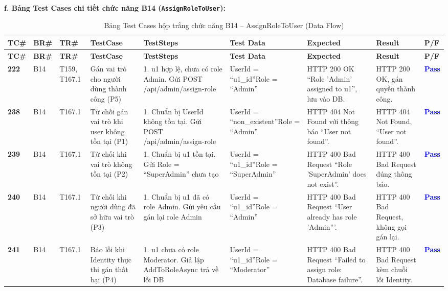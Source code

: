 \documentclass[11pt,a4paper]{article}
\begin{document}
\noindent\textbf{f. Bảng Test Cases chi tiết chức năng B14 (\texttt{AssignRoleToUser}):}
\begingroup
\scriptsize
\setlength{\tabcolsep}{3pt}
\begin{longtable}{|C{0.8cm}|C{0.75cm}|C{0.95cm}|L{2.0cm}|L{3.0cm}|L{2.25cm}|L{2.6cm}|L{2.5cm}|C{0.85cm}|}
\hline
{}
\textbf{TC\#} & \textbf{BR\#} & \textbf{TR\#} & \textbf{TestCase} & \textbf{TestSteps} & \textbf{Test Data} & \textbf{Expected} & \textbf{Result} & \textbf{P/F} \tabularnewline
\hline
\endfirsthead
\hline
{}
\textbf{TC\#} & \textbf{BR\#} & \textbf{TR\#} & \textbf{TestCase} & \textbf{TestSteps} & \textbf{Test Data} & \textbf{Expected} & \textbf{Result} & \textbf{P/F} \tabularnewline
\hline
\endhead
\hline
\endfoot
\hline
\caption{Bảng Test Cases hộp trắng chức năng B14 -- AssignRoleToUser (Data Flow)}
\endlastfoot
\textbf{222} & B14 & T159, T167.1 & Gán vai trò cho người dùng thành công (P5) & 1. u1 hợp lệ, chưa có role Admin. Gửi POST /api/admin/\allowbreak assign-role & UserId = ``u1\_id''\newline Role = ``Admin'' & HTTP 200 OK ``Role 'Admin' assigned to u1'', lưu vào DB. & HTTP 200 OK, gán quyền thành công. & \textcolor{blue}{\textbf{Pass}} \\ \hline
\textbf{238} & B14 & T167.1 & Từ chối gán vai trò khi user không tồn tại (P1) & 1. Chuẩn bị UserId không tồn tại. Gửi POST /api/admin/\allowbreak assign-role & UserId = ``non\_\allowbreak existent''\newline Role = ``Admin'' & HTTP 404 Not Found với thông báo ``User not found''. & HTTP 404 Not Found, ``User not found''. & \textcolor{blue}{\textbf{Pass}} \\ \hline
\textbf{239} & B14 & T167.1 & Từ chối khi vai trò không tồn tại (P2) & 1. Chuẩn bị u1 tồn tại. Gửi Role = ``SuperAdmin'' chưa tạo & UserId = ``u1\_id''\newline Role = ``SuperAdmin'' & HTTP 400 Bad Request ``Role 'SuperAdmin' does not exist''. & HTTP 400 Bad Request đúng thông báo. & \textcolor{blue}{\textbf{Pass}} \\ \hline
\textbf{240} & B14 & T167.1 & Từ chối khi người dùng đã sở hữu vai trò (P3) & 1. Chuẩn bị u1 đã có role Admin. Gửi yêu cầu gán lại role Admin & UserId = ``u1\_id''\newline Role = ``Admin'' & HTTP 400 Bad Request ``User already has role 'Admin'''. & HTTP 400 Bad Request, không gọi gán lại. & \textcolor{blue}{\textbf{Pass}} \\ \hline
\textbf{241} & B14 & T167.1 & Báo lỗi khi Identity thực thi gán thất bại (P4) & 1. u1 chưa có role Moderator. Giả lập AddToRoleAsync trả về lỗi DB & UserId = ``u1\_id''\newline Role = ``Moderator'' & HTTP 400 Bad Request ``Failed to assign role: Database failure''. & HTTP 400 Bad Request kèm chuỗi lỗi Identity. & \textcolor{blue}{\textbf{Pass}} \\ \hline
\end{longtable}
\endgroup
\end{document}

